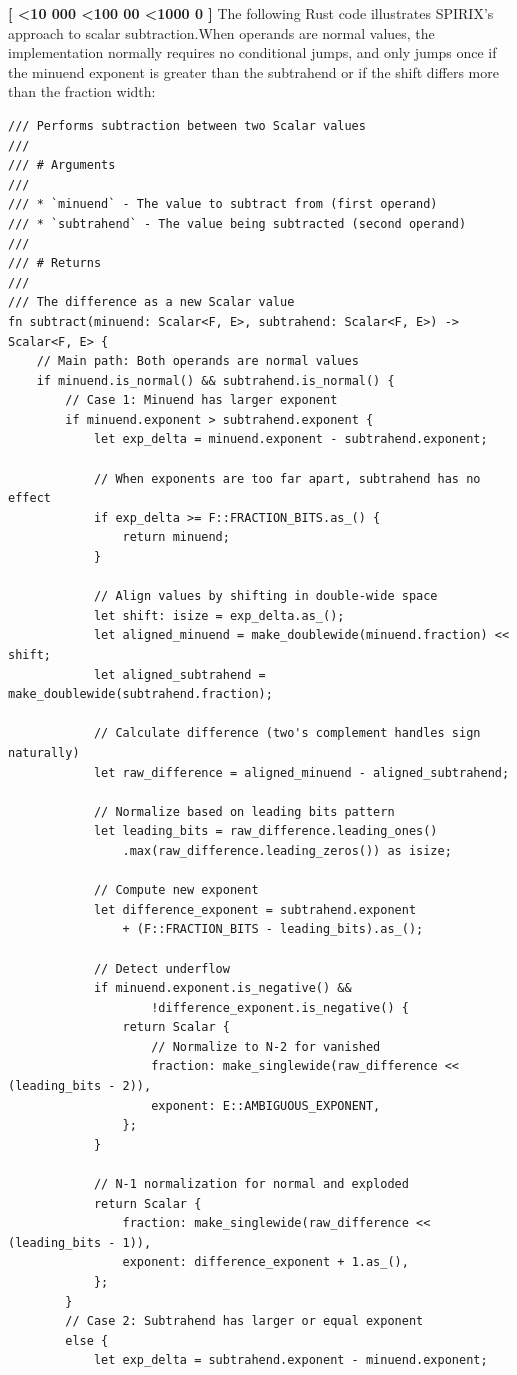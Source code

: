 \documentclass[12pt,letter]{article}
\newcounter{paracounter}
\newcommand{\ppara}[1]{
\noindent\textbf{[\formatparanumber{\arabic{paracounter}}]} \begingroup\RaggedRight\sloppy\hbadness=10000 #1\par\endgroup%
\stepcounter{paracounter}%
}
\newcommand{\formatparanumber}[1]{%
\ifnum#1<10 000%
\else\ifnum#1<100 00%
\else\ifnum#1<1000 0%
\fi\fi\fi#1%
}
\begin{document}
\ppara{The following Rust code illustrates SPIRIX's approach to scalar subtraction.\hspace{0.2cm}When operands are normal values, the implementation normally requires no conditional jumps, and only jumps once if the minuend exponent is greater than the subtrahend or if the shift differs more than the fraction width:}

\begin{lstlisting}[style=rust, caption={SPIRIX Scalar Subtraction Implementation}, label={fig:scalar_subtract}]
/// Performs subtraction between two Scalar values
///
/// # Arguments
///
/// * `minuend` - The value to subtract from (first operand)
/// * `subtrahend` - The value being subtracted (second operand)
///
/// # Returns
///
/// The difference as a new Scalar value
fn subtract(minuend: Scalar<F, E>, subtrahend: Scalar<F, E>) -> Scalar<F, E> {
	// Main path: Both operands are normal values
	if minuend.is_normal() && subtrahend.is_normal() {
		// Case 1: Minuend has larger exponent
		if minuend.exponent > subtrahend.exponent {
			let exp_delta = minuend.exponent - subtrahend.exponent;

			// When exponents are too far apart, subtrahend has no effect
			if exp_delta >= F::FRACTION_BITS.as_() {
				return minuend;
			}

			// Align values by shifting in double-wide space
			let shift: isize = exp_delta.as_();
			let aligned_minuend = make_doublewide(minuend.fraction) << shift;
			let aligned_subtrahend = make_doublewide(subtrahend.fraction);

			// Calculate difference (two's complement handles sign naturally)
			let raw_difference = aligned_minuend - aligned_subtrahend;

			// Normalize based on leading bits pattern
			let leading_bits = raw_difference.leading_ones()
				.max(raw_difference.leading_zeros()) as isize;

			// Compute new exponent
			let difference_exponent = subtrahend.exponent 
				+ (F::FRACTION_BITS - leading_bits).as_();

			// Detect underflow
			if minuend.exponent.is_negative() &&
					!difference_exponent.is_negative() {
				return Scalar {
					// Normalize to N-2 for vanished
					fraction: make_singlewide(raw_difference << (leading_bits - 2)),
					exponent: E::AMBIGUOUS_EXPONENT,
				};
			}

			// N-1 normalization for normal and exploded
			return Scalar {
				fraction: make_singlewide(raw_difference << (leading_bits - 1)),
				exponent: difference_exponent + 1.as_(),
			};
		} 
		// Case 2: Subtrahend has larger or equal exponent
		else {
			let exp_delta = subtrahend.exponent - minuend.exponent;


\end{lstlisting}
\end{document}
